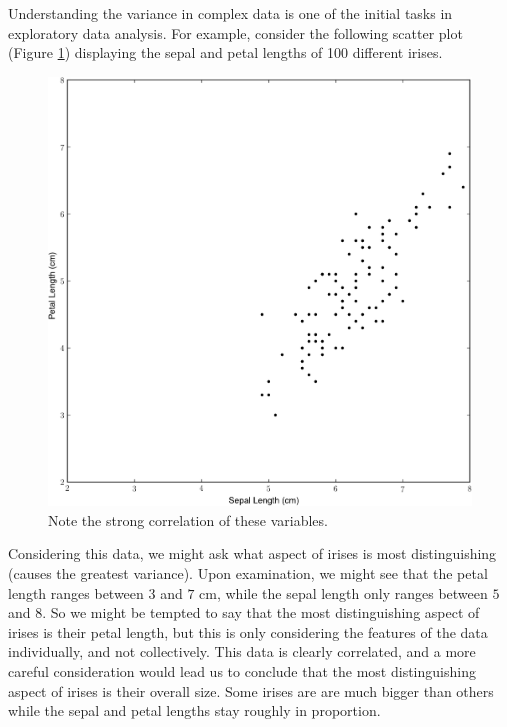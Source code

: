 
Understanding the variance in complex data is one of the initial tasks in exploratory data analysis. For example, consider the following scatter plot (Figure \ref{fig:iris_1}) displaying the sepal and petal lengths of 100 different irises.
\begin{figure}
\includegraphics[width=\textwidth]{iris0.pdf}
\caption{Note the strong correlation of these variables.}
\label{fig:iris_1}
\end{figure}
Considering this data, we might ask what aspect of irises is most distinguishing (causes the greatest variance). Upon examination, we might see that the petal length ranges between $3$ and $7$ cm, while the sepal length only ranges between $5$ and $8$. So we might be tempted to say that the most distinguishing aspect of irises is their petal length, but this is only considering the features of the data individually, and not collectively. This data is clearly correlated, and a more careful consideration would lead us to conclude that the most distinguishing aspect of irises is their overall size. Some irises are are much bigger than others while the sepal and petal lengths stay roughly in proportion.
